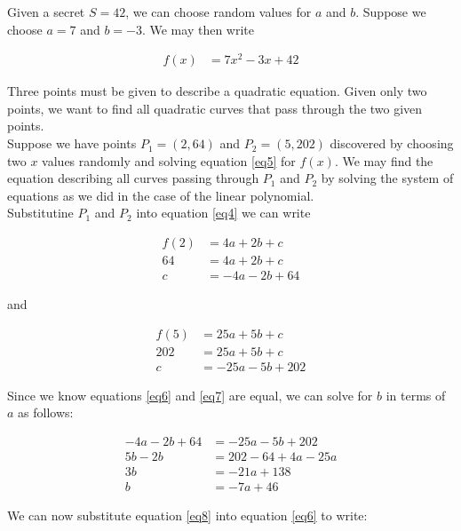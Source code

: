 \documentclass[preview,border=3mm]{article}
\begin{document}
\noindent
Given a secret $S = 42$, we can choose random values for $a$ and $b$. Suppose
we choose $a = 7$ and $b = -3$. We may then write

\begin{align}
    f(x) &= 7x^2 - 3x + 42 \label{eq5}
\end{align}

\noindent
Three points must be given to describe a quadratic equation. Given only two
points, we want to find all quadratic curves that pass through the two given
points.\\

\noindent
Suppose we have points $P_1 = (2, 64)$ and $P_2 = (5, 202)$ discovered by choosing
two $x$ values randomly and solving equation \ref{eq5} for $f(x)$. We may find
the equation describing all curves passing through $P_1$ and $P_2$ by solving
the system of equations as we did in the case of the linear polynomial.\\

\noindent
Substitutine $P_1$ and $P_2$ into equation \ref{eq4} we can write

\begin{align}
    f(2) &= 4a + 2b + c \nonumber \\
    64   &= 4a + 2b + c \nonumber \\
    c    &= -4a - 2b + 64 \label{eq6}
\end{align}

\noindent
and

\begin{align}
    f(5) &= 25a + 5b + c \nonumber \\
    202  &= 25a + 5b + c \nonumber \\
    c    &= -25a - 5b + 202 \label{eq7}
\end{align}

\noindent
Since we know equations \ref{eq6} and \ref{eq7} are equal, we can solve for $b$
in terms of $a$ as follows:

\begin{align}
    -4a - 2b + 64 &= -25a - 5b + 202 \nonumber \\
    5b - 2b       &= 202 - 64 + 4a - 25a \nonumber \\
    3b            &= -21a + 138 \nonumber\\
    b             &= -7a + 46 \label{eq8}
\end{align}

\noindent
We can now substitute equation \ref{eq8} into equation \ref{eq6} to write:
\end{document}
